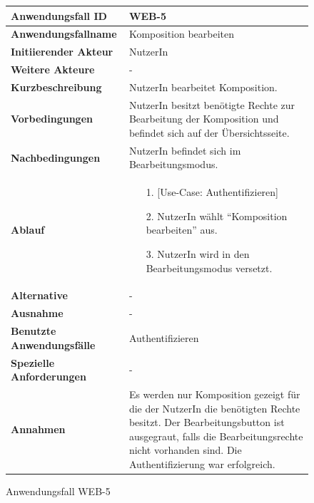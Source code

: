 \begin{figure}[h]
	\centering
	\begin{tabularx}{\textwidth}{ X | X }
		\textbf{Anwendungsfall ID} & WEB-5 \\ \hline
		\textbf{Anwendungsfallname} & Komposition bearbeiten \\ \hline
		\textbf{Initiierender Akteur} & NutzerIn \\ \hline
		\textbf{Weitere Akteure} & - \\ \hline
		\textbf{Kurzbeschreibung} & NutzerIn bearbeitet Komposition. \\ \hline
		\textbf{Vorbedingungen} & NutzerIn besitzt benötigte Rechte zur Bearbeitung der Komposition und befindet sich auf der Übersichtsseite. \\ \hline
		\textbf{Nachbedingungen} & NutzerIn befindet sich im Bearbeitungsmodus. \\ \hline
		\textbf{Ablauf} &
		\begin{enumerate}
			\item[1.] [Use-Case: Authentifizieren]
			\item[2.] NutzerIn wählt ``Komposition bearbeiten'' aus.
			\item[3.] NutzerIn wird in den Bearbeitungsmodus versetzt.
		\end{enumerate} \\ \hline
		\textbf{Alternative} & - \\ \hline
		\textbf{Ausnahme} & - \\ \hline
		\textbf{Benutzte Anwendungsfälle} & Authentifizieren \\ \hline
		\textbf{Spezielle Anforderungen} & - \\ \hline
		\textbf{Annahmen} & Es werden nur Komposition gezeigt für die der NutzerIn die benötigten Rechte besitzt.
                  Der Bearbeitungsbutton ist ausgegraut, falls die Bearbeitungsrechte nicht vorhanden sind. Die Authentifizierung war erfolgreich.
	\end{tabularx}
	\caption{Anwendungsfall WEB-5}
	\label{fig:anwendungsfall-server-tabelle-web-5}
\end{figure}

